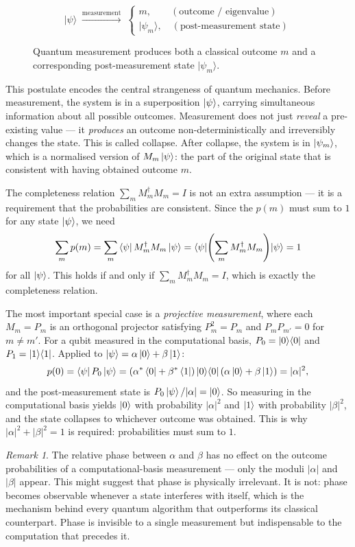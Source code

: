 \documentclass[12pt, a4paper, oneside]{report}
\theoremstyle{plain}
\theoremstyle{definition}
\theoremstyle{remark}
\newtheorem{remark}[theorem]{Remark}
\newcommand{\oket}[2]{\ket{#1}\!\bra{#2}}
\begin{document}
\begin{figure}[h]
\centering
\[
|\psi\rangle 
\;\xrightarrow{\text{measurement}}\;
\begin{cases}
m, \qquad  (\text{outcome / eigenvalue}) \\
|\psi_m\rangle, \quad (\text{post-measurement state})
\end{cases}
\]
\caption{Quantum measurement produces both a classical outcome $m$ and a corresponding post-measurement state $|\psi_m\rangle$.}
\label{fig:measurement}
\end{figure}

This postulate encodes the central strangeness of quantum mechanics. Before measurement,
the system is in a superposition $\ket{\psi}$, carrying simultaneous information about all
possible outcomes. Measurement does not just \emph{reveal} a pre-existing value --- it
\emph{produces} an outcome non-deterministically and irreversibly changes the state. This is
called collapse. After collapse, the system is in $\ket{\psi_m}$, which is a normalised
version of $M_m\ket{\psi}$: the part of the original state that is consistent with having
obtained outcome $m$.

The completeness relation $\sum_m M_m^\dagger M_m = I$ is not an extra assumption --- it is
a requirement that the probabilities are consistent. Since the $p(m)$ must sum to $1$ for
any state $\ket{\psi}$, we need
\[
  \sum_m p(m) = \sum_m \bra{\psi}M_m^\dagger M_m\ket{\psi}
              = \bra{\psi}\!\left(\sum_m M_m^\dagger M_m\right)\!\ket{\psi} = 1
\]
for all $\ket{\psi}$. This holds if and only if $\sum_m M_m^\dagger M_m = I$, which is
exactly the completeness relation.

The most important special case is a \emph{projective measurement}, where each $M_m = P_m$
is an orthogonal projector satisfying $P_m^2 = P_m$ and $P_m P_{m'} = 0$ for $m \neq m'$.
For a qubit measured in the computational basis, $P_0 = \oket{0}{0}$ and $P_1 = \oket{1}{1}$.
Applied to $\ket{\psi} = \alpha\ket{0} + \beta\ket{1}$:
\[
  p(0) = \bra{\psi}P_0\ket{\psi}
       = (\alpha^*\bra{0}+\beta^*\bra{1})\oket{0}{0}(\alpha\ket{0}+\beta\ket{1})
       = |\alpha|^2,
\]
and the post-measurement state is $P_0\ket{\psi}/|\alpha| = \ket{0}$. So measuring in the
computational basis yields $\ket{0}$ with probability $|\alpha|^2$ and $\ket{1}$ with
probability $|\beta|^2$, and the state collapses to whichever outcome was obtained. This is
why $|\alpha|^2 + |\beta|^2 = 1$ is required: probabilities must sum to $1$.

\begin{remark}
The relative phase between $\alpha$ and $\beta$ has no effect on the outcome probabilities
of a computational-basis measurement --- only the moduli $|\alpha|$ and $|\beta|$ appear.
This might suggest that phase is physically irrelevant. It is not: phase becomes observable
whenever a state interferes with itself, which is the mechanism behind every quantum
algorithm that outperforms its classical counterpart. Phase is invisible to a single
measurement but indispensable to the computation that precedes it.
\end{remark}
\end{document}
